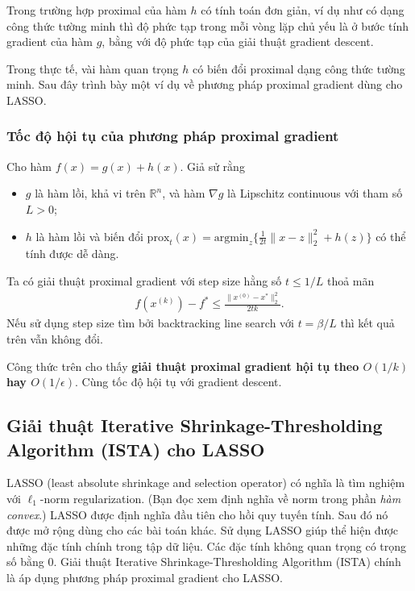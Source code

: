 \documentclass{book}
\begin{document}
Trong trường hợp proximal của hàm $h$ có tính toán đơn giản, ví dụ như có dạng công thức tường minh thì độ phức tạp trong mỗi vòng lặp chủ yếu là ở bước tính gradient của hàm $g$, bằng với độ phức tạp của giải thuật gradient descent.

Trong thực tế, vài hàm quan trọng $h$ có biến đổi proximal dạng công thức tường minh.
Sau đây trình bày một ví dụ về phương pháp proximal gradient dùng cho LASSO.


\subsubsection*{Tốc độ hội tụ của phương pháp proximal gradient}
Cho hàm $f(x) = g(x) + h(x)$. Giả sử rằng
\begin{itemize}
\item $g$ là hàm lồi, khả vi trên $\mathbb{R}^n$, và hàm $\nabla g$ là Lipschitz continuous với tham số $L>0$;
\item $h$ là hàm lồi và biến đổi $\mathrm{prox}_t(x) = \mathrm{argmin}_z \{ \frac{1}{2t}\| x - z \|_2^2  + h(z) \}$ có thể tính được dễ dàng.
\end{itemize}

Ta có giải thuật proximal gradient với step size hằng số $t \leq 1/L$ thoả mãn
\begin{align*}
f(x^{(k)}) - f^* \leq \frac{\|x^{(0)} - x^*\|_2^2}{2tk}.
\end{align*}
Nếu sử dụng step size tìm bởi backtracking line search với $t = \beta / L$ thì kết quả trên vẫn không đổi.

Công thức trên cho thấy \textbf{giải thuật proximal gradient hội tụ theo $O(1/k)$ hay $O(1/\epsilon)$}.
Cùng tốc độ hội tụ với gradient descent.


\subsection{Giải thuật Iterative Shrinkage-Thresholding Algorithm (ISTA) cho LASSO}
LASSO (least absolute shrinkage and selection operator) có nghĩa là tìm nghiệm với $\ell_1$-norm regularization. (Bạn đọc xem định nghĩa về norm trong phần \textit{hàm convex}.)
LASSO được định nghĩa đầu tiên cho hồi quy tuyến tính. Sau đó nó được mở rộng dùng cho các bài toán khác.
Sử dụng LASSO giúp thể hiện được những đặc tính chính trong tập dữ liệu. Các đặc tính không quan trọng có trọng số bằng 0.
Giải thuật Iterative Shrinkage-Thresholding Algorithm (ISTA) chính là áp dụng phương pháp proximal gradient cho LASSO.
\end{document}
